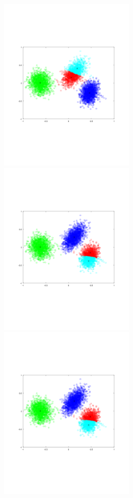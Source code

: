 \documentclass[11pt]{article}
\begin{document}
\includegraphics[width=0.5\textwidth]{q4/k4_1.png}
\includegraphics[width=0.5\textwidth]{q4/k4_2.png}
\includegraphics[width=0.5\textwidth]{q4/k4_3.png}
\end{document}
